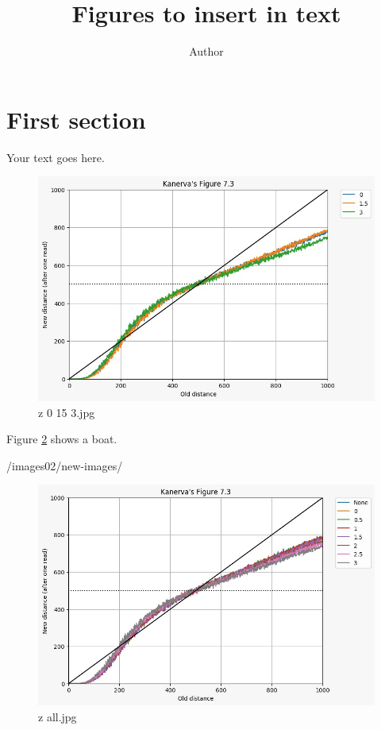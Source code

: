 \documentclass[11pt]{article} %
\title{Figures to insert in text}
\author{Author}
\begin{document}
\maketitle

\section{First section}

Your text goes here.


\begin{figure}
  \includegraphics[width=\linewidth]{./images02/new-images/z_0_15_3.jpg}
  \caption{z  0  15  3.jpg}
  \label{fig:boat1}
\end{figure}

Figure \ref{fig:boat1} shows a boat.

/images02/new-images/



\begin{figure}
  \includegraphics[width=\linewidth]{./images02/new-images/z_all.jpg}
  \caption{z  all.jpg}
  \label{fig:boat1}
\end{figure}
\end{document}
